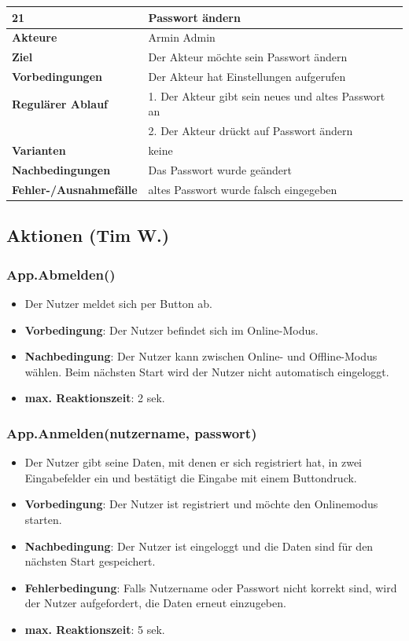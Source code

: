 \documentclass[fontsize=12pt,paper=a4,twoside]{scrartcl}
\begin{document}
\begin{table}
	[H] \label{21} 
	\begin{tabular}
		{|l|p{10cm}|} \hline \textbf{21} & \textbf{Passwort ändern} \\
		\hline \textbf{Akteure} & Armin Admin\\
		\hline \textbf{Ziel} & Der Akteur möchte sein Passwort ändern\\
		\hline \textbf{Vorbedingungen} & Der Akteur hat Einstellungen aufgerufen\\
		\hline \textbf{Regulärer Ablauf} & 1. Der Akteur gibt sein neues und altes Passwort an\\
		&2. Der Akteur drückt auf Passwort ändern\\
		\hline \textbf{Varianten} & keine \\
		\hline \textbf{Nachbedingungen} & Das Passwort wurde geändert\\
		\hline \textbf{Fehler-/Ausnahmefälle} & altes Passwort wurde falsch eingegeben \\
		\hline 
	\end{tabular}
\end{table}


\subsection{Aktionen (Tim W.)}
\subsubsection{App.Abmelden()}
\begin{itemize}
\item Der Nutzer meldet sich per Button ab.
\item \textbf{Vorbedingung}: Der Nutzer befindet sich im Online-Modus.
\item \textbf{Nachbedingung}: Der Nutzer kann zwischen Online- und Offline-Modus wählen. Beim nächsten Start wird der Nutzer nicht automatisch eingeloggt.
\item \textbf{max. Reaktionszeit}: 2 sek.
\end{itemize}

\subsubsection{App.Anmelden(nutzername, passwort)}
\begin{itemize}
\item Der Nutzer gibt seine Daten, mit denen er sich registriert hat, in zwei Eingabefelder ein und bestätigt die Eingabe mit einem Buttondruck.
\item \textbf{Vorbedingung}: Der Nutzer ist registriert und möchte den Onlinemodus starten. 
\item \textbf{Nachbedingung}: Der Nutzer ist eingeloggt und die Daten sind für den nächsten Start gespeichert.
\item \textbf{Fehlerbedingung}: Falls Nutzername oder Passwort nicht korrekt sind, wird der Nutzer aufgefordert, die Daten erneut einzugeben.
\item \textbf{max. Reaktionszeit}: 5 sek.
\end{itemize}
\end{document}
